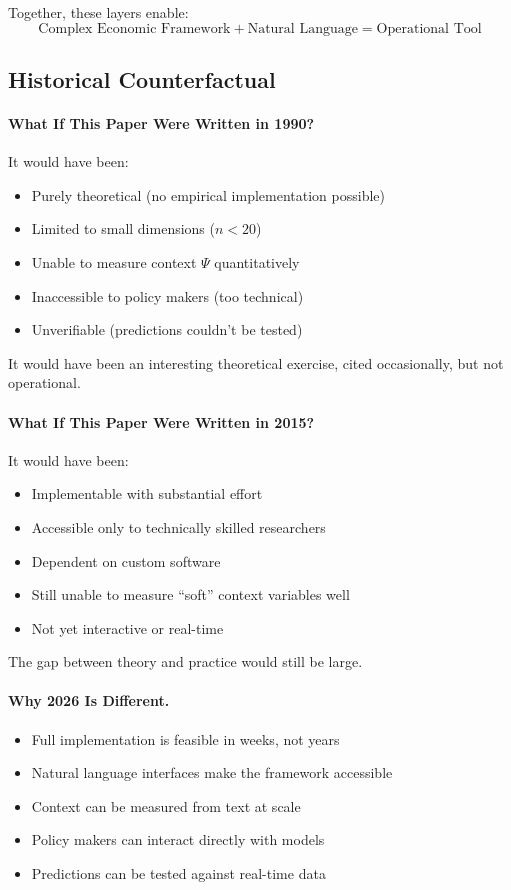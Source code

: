 Together, these layers enable:
\begin{equation}
  \text{Complex Economic Framework} + \text{Natural Language} = \text{Operational Tool}
\end{equation}

\subsection{Historical Counterfactual}

\paragraph{What If This Paper Were Written in 1990?}
It would have been:
\begin{itemize}
  \item Purely theoretical (no empirical implementation possible)
  \item Limited to small dimensions ($n < 20$)
  \item Unable to measure context $\Psi$ quantitatively
  \item Inaccessible to policy makers (too technical)
  \item Unverifiable (predictions couldn't be tested)
\end{itemize}

It would have been an interesting theoretical exercise, 
cited occasionally, but not operational.

\paragraph{What If This Paper Were Written in 2015?}
It would have been:
\begin{itemize}
  \item Implementable with substantial effort
  \item Accessible only to technically skilled researchers
  \item Dependent on custom software
  \item Still unable to measure ``soft'' context variables well
  \item Not yet interactive or real-time
\end{itemize}

The gap between theory and practice would still be large.

\paragraph{Why 2026 Is Different.}
\begin{itemize}
  \item Full implementation is feasible in weeks, not years
  \item Natural language interfaces make the framework accessible
  \item Context can be measured from text at scale
  \item Policy makers can interact directly with models
  \item Predictions can be tested against real-time data
\end{itemize}

